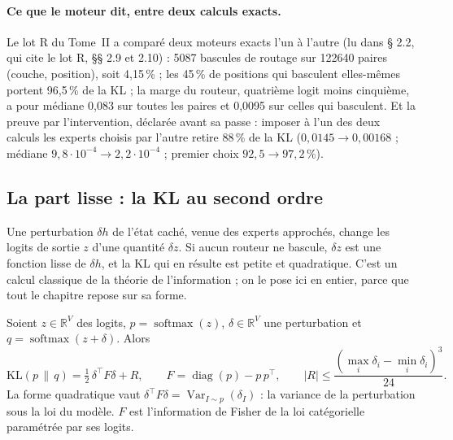 \paragraph{Ce que le moteur dit, entre deux calculs exacts.} Le lot R du Tome~II a comparé deux moteurs exacts l'un à l'autre (lu dans  § 2.2, qui cite le lot R, §§ 2.9 et 2.10) \mes : \num{5087} bascules de routage sur \num{122640} paires (couche, position), soit 4,15\,\% ; les 45\,\% de positions qui basculent elles-mêmes portent 96,5\,\% de la KL ; la marge du routeur, quatrième logit moins cinquième, a pour médiane 0,083 sur toutes les paires et 0,0095 sur celles qui basculent. Et la preuve par l'intervention, déclarée avant sa passe : imposer à l'un des deux calculs les experts choisis par l'autre retire 88\,\% de la KL ($0{,}0145 \to 0{,}00168$ ; médiane $9{,}8\cdot10^{-4} \to 2{,}2\cdot10^{-4}$ ; premier choix $92{,}5 \to 97{,}2\,\%$).

\subsection{La part lisse : la KL au second ordre}

Une perturbation $\delta h$ de l'état caché, venue des experts approchés, change les logits de sortie $z$ d'une quantité $\delta z$. Si aucun routeur ne bascule, $\delta z$ est une fonction lisse de $\delta h$, et la KL qui en résulte est petite et quadratique. C'est un calcul classique de la théorie de l'information \parencite{cover2006} ; on le pose ici en entier, parce que tout le chapitre repose sur sa forme.

\begin{proposition}\label{t3syn:prop:kl2}
Soient $z \in \mathbb{R}^V$ des logits, $p = \operatorname{softmax}(z)$, $\delta \in \mathbb{R}^V$ une perturbation et $q = \operatorname{softmax}(z + \delta)$. Alors
\begin{equation}\label{t3syn:eq:kl2}
\mathrm{KL}(p \,\|\, q) = \tfrac12\, \delta^{\top} F \delta + R, \qquad F = \operatorname{diag}(p) - p\,p^{\top}, \qquad |R| \le \frac{(\max_i \delta_i - \min_i \delta_i)^3}{24}.
\end{equation}
La forme quadratique vaut $\delta^{\top} F \delta = \operatorname{Var}_{I \sim p}(\delta_I)$ : la variance de la perturbation sous la loi du modèle. $F$ est l'information de Fisher de la loi catégorielle paramétrée par ses logits.
\end{proposition}

